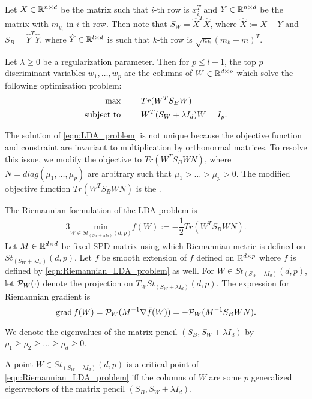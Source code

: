 \documentclass[11pt,a4paper]{article}
\begin{document}
Let $X\in\mathbb{R}^{n\times d}$ be the matrix such that $i$-th row is $x_i^T$ and $Y\in \mathbb{R}^{n\times d}$ be the matrix with $m_{y_i}$ in $i$-th row. Then note that $S_W = \hat{X}^T\hat{X}$, where $\hat{X} := X-Y$ and $S_B = \hat{Y}^T\hat{Y}$, where $\hat{Y}\in\mathbb{R}^{l\times d}$ is such that $k$-th row is $\sqrt{n_k}(m_k-m)^T$.

Let $\lambda\ge 0$ be a regularization parameter. Then for $p\le l-1$, the top $p$ discriminant variables $w_1,\ldots,w_p$ are the columns of $W\in\mathbb{R}^{d\times p}$ which solve the following optimization problem:
\begin{alignat}{3}
{\text{max}}& &&Tr(W^TS_BW) \nonumber\\
\text{subject to}&\hspace{0.5cm} &&W^T (S_W+\lambda I_d) W = I_p. \label{eqn:LDA_problem}
\end{alignat}

The solution of \eqref{eqn:LDA_problem} is not unique because the objective function and constraint are invariant to multiplication by orthonormal matrices. To resolve this issue, we modify the objective to $Tr(W^TS_BWN)$, where $N = diag(\mu_1,\ldots,\mu_p)$ are arbitrary such that $\mu_1>\ldots>\mu_p>0$. The modified objective function $Tr(W^TS_BWN)$ is the .

The Riemannian formulation of the LDA problem is 
\begin{alignat}{3}
\underset{W\in St_{(S_W+\lambda I_d)}(d,p)}{\text{min}} f(W) := -\dfrac{1}{2} Tr(W^TS_BWN). \label{eqn:Riemannian_LDA_problem}
\end{alignat}
Let $M\in \mathbb{R}^{d\times d}$ be fixed SPD matrix using which Riemannian metric is defined on $St_{(S_W+\lambda I_d)}(d,p)$. Let $\bar{f}$ be smooth extension of $f$ defined on $\mathbb{R}^{d\times p}$ where $\bar{f}$ is defined by \eqref{eqn:Riemannian_LDA_problem} as well. For $W\in St_{(S_W+\lambda I_d)}(d,p)$, let $\mathcal{P}_W(\cdot)$ denote the projection on $T_W St_{(S_W+\lambda I_d)}(d,p)$. The expression for Riemannian gradient is 
\begin{equation}
\text{grad}\, f(W) = \mathcal{P}_W (M^{-1}\nabla \bar{f}(W)) = -\mathcal{P}_W (M^{-1}S_B WN).
\end{equation}

We denote the eigenvalues of the matrix pencil $(S_B,S_W+\lambda I_d)$ by $\rho_1\ge \rho_2\ge\ldots\ge \rho_d\ge 0$.

\begin{proposition}
A point $W\in St_{(S_W+\lambda I_d)}(d,p)$ is a critical point of \eqref{eqn:Riemannian_LDA_problem} iff the columns of $W$ are some $p$ generalized eigenvectors of the matrix pencil $(S_B,S_W+\lambda I_d)$.
\end{proposition}
\end{document}
